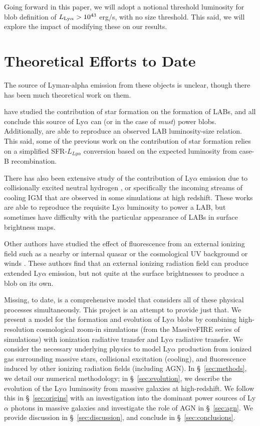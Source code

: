 Going forward in this paper, we will adopt a notional threshold luminosity for blob definition of $L_{\rm Ly\alpha} > 10^{43}$ erg/s, with no size threshold.
This said, we will explore the impact of modifying these on our results.

\section{Theoretical Efforts to Date}

The source of Lyman-alpha emission from these objects is unclear, though there has been much theoretical work on them.

\citet{Furlanetto2005, Laursen2007, Cen2013, Geach2016, Gronke2017} have studied the contribution of star formation on the formation of LABs, and all conclude this source of Ly$\alpha$ can (or in the case of \citet{Cen2013} \emph{must}) power blobs.
Additionally, \citet{Cen2013} are able to reproduce an observed LAB luminosity-size relation.
This said, some of the previous work on the contribution of star formation relies on a simplified SFR-$L_{Ly\alpha}$ conversion based on the expected luminosity from case-B recombination.

There has also been extensive study of the contribution of Ly$\alpha$ emission due to collisionally excited neutral hydrogen \citep{Rosdahl2012, Fardal2001, Goerdt2010, Haiman2000, Faucher-Giguere2010}, or specifically the incoming streams of cooling IGM that are observed in some simulations at high redshift.
These works are able to reproduce the requisite Ly$\alpha$ luminosity to power a LAB, but sometimes have difficulty with the particular appearance of LABs in surface brightness maps.

Other authors have studied the effect of fluorescence from an external ionizing field such as a nearby or internal quasar \citep{Haiman2001} or the cosmological UV background or winds \citep{Furlanetto2005, Mas-Ribas2016}.
These authors find that an external ionizing radiation field can produce extended Ly$\alpha$ emission, but not quite at the surface brightnesses to produce a blob on its own.

Missing, to date, is a comprehensive model that considers all of these physical processes simultaneously.
This project is an attempt to provide just that.
We present a model for the formation and evolution of Ly$\alpha$ blobs by combining high-resolution cosmological zoom-in simulations (from the MassiveFIRE series of simulations) with ionization radiative transfer and Ly$\alpha$ radiative transfer.
We consider the necessary underlying physics to model Ly$\alpha$ production from ionized gas surrounding massive stars, collisional excitation (cooling), and fluorescence induced by other ionizing radiation fields (including AGN).
In \S~\ref{sec:methods}, we detail our numerical methodology; in \S~\ref{sec:evolution}, we describe the evolution of the Ly$\alpha$ luminosity from massive galaxies at high-redshift.
We follow this in \S~\ref{sec:origins} with an investigation into the dominant power sources of Ly$\alpha$ photons in massive galaxies and investigate the role of AGN in \S~\ref{sec:agn}.
We provide discussion in \S~\ref{sec:discussion}, and conclude in \S~\ref{sec:conclusions}.

